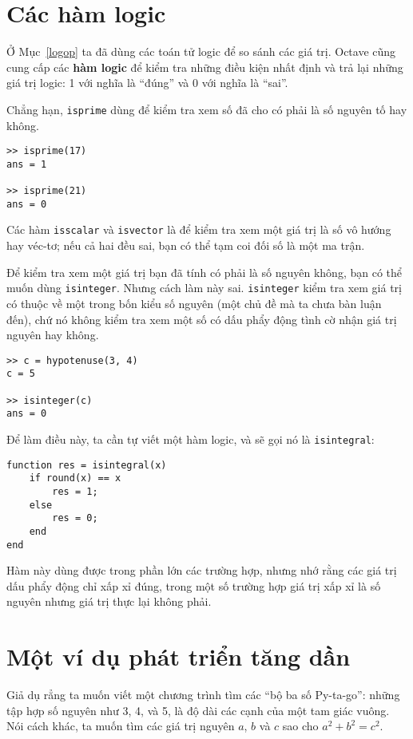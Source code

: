 \documentclass[12pt]{book}
\begin{document}
\section{Các hàm logic}

Ở Mục~\ref{logop} ta đã dùng các toán tử logic để so sánh các 
giá trị. Octave cũng cung cấp các {\bf hàm logic} để kiểm tra những
điều kiện nhất định và trả lại những giá trị logic: 1 với nghĩa là 
``đúng'' và 0 với nghĩa là ``sai''.

Chẳng hạn, {\tt isprime} dùng để kiểm tra xem số đã cho có
phải là số nguyên tố hay không.

\begin{verbatim}
>> isprime(17)
ans = 1

>> isprime(21)
ans = 0
\end{verbatim}
%
Các hàm {\tt isscalar} và {\tt isvector} là để kiểm tra xem một
giá trị là số vô hướng hay véc-tơ; nếu cả hai đều sai, bạn có thể
tạm coi đối số là một ma trận.

Để kiểm tra xem một giá trị bạn đã tính có phải là số nguyên không,
bạn có thể muốn dùng {\tt isinteger}.  Nhưng cách làm này sai.
{\tt isinteger} kiểm tra xem giá trị có thuộc về một trong bốn kiểu
số nguyên (một chủ đề mà ta chưa bàn luận đến), chứ nó không kiểm
tra xem một số có dấu phẩy động tình cờ nhận giá trị nguyên hay không.

\begin{verbatim}
>> c = hypotenuse(3, 4)
c = 5

>> isinteger(c)
ans = 0
\end{verbatim}
%
Để làm điều này, ta cần tự viết một hàm logic, và sẽ gọi nó
là {\tt isintegral}:

\begin{verbatim}
function res = isintegral(x)
    if round(x) == x
        res = 1;
    else
        res = 0;
    end
end
\end{verbatim}
%
Hàm này dùng được trong phần lớn các trường hợp, nhưng nhớ rằng
các giá trị dấu phẩy động chỉ xấp xỉ đúng, trong một số trường hợp
giá trị xấp xỉ là số nguyên nhưng giá trị thực lại không phải.


\section{Một ví dụ phát triển tăng dần}
\label{increxample}

Giả dụ rẳng ta muốn viết một chương trình tìm các ``bộ ba số
Py-ta-go'': những tập hợp số nguyên như 3, 4, và 5, là độ dài
các cạnh của một tam giác vuông. Nói cách khác, ta muốn tìm các
giá trị nguyên $a$, $b$ và $c$ sao cho $a^2 + b^2 = c^2$.
\end{document}
